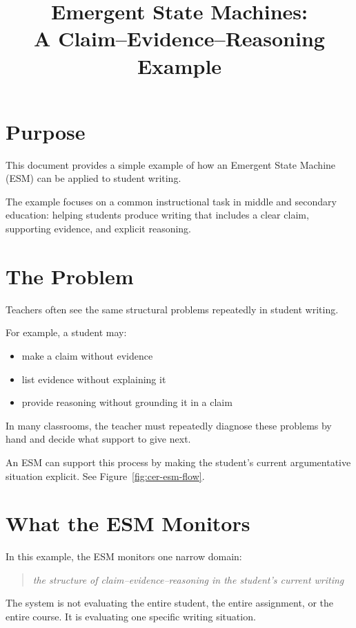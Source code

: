 \documentclass[11pt]{article}
\title{Emergent State Machines:\\A Claim--Evidence--Reasoning Example}
\author{}
\date{}
\begin{document}
\maketitle

\section{Purpose}

This document provides a simple example of how an Emergent State Machine (ESM) can be applied to student writing.

The example focuses on a common instructional task in middle and secondary education: helping students produce writing that includes a clear claim, supporting evidence, and explicit reasoning.

\section{The Problem}

Teachers often see the same structural problems repeatedly in student writing.

For example, a student may:

\begin{itemize}
\item make a claim without evidence
\item list evidence without explaining it
\item provide reasoning without grounding it in a claim
\end{itemize}

In many classrooms, the teacher must repeatedly diagnose these problems by hand and decide what support to give next.

An ESM can support this process by making the student's current argumentative situation explicit. See Figure~\ref{fig:cer-esm-flow}.



\section{What the ESM Monitors}

In this example, the ESM monitors one narrow domain:

\begin{quote}
\textit{the structure of claim--evidence--reasoning in the student's current writing}
\end{quote}

The system is not evaluating the entire student, the entire assignment, or the entire course. It is evaluating one specific writing situation.
\end{document}
